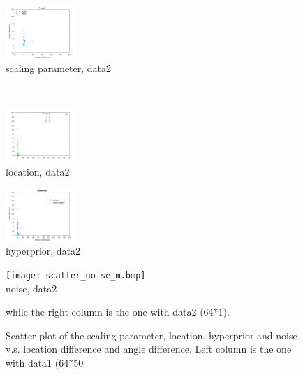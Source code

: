 \documentclass[5p]{elsarticle}
\begin{document}
\begin{frontmatter}
\begin{figure}[h!]
\begin{footnotesize}
\begin{center}
\begin{minipage}{3cm}
\begin{center}
\end{center}\end{minipage}
\begin{minipage}{3cm} \begin{center}
\includegraphics[height=2.0cm]{scatter_theta0_m.png} \\ scaling parameter, data2 
\end{center}\end{minipage}\
\begin{minipage}{3cm} \begin{center}
\includegraphics[height=2.0cm]{scatter_loc_m.png}\\location, data2  
\end{center}\end{minipage}
\begin{minipage}{3cm} \begin{center}
\includegraphics[height=2.0cm]{scatter_hyperprior_m.png} \\ hyperprior, data2  
\end{center}\end{minipage}
\begin{minipage}{3cm} \begin{center}
\texttt{[image: scatter\_noise\_m.bmp]} \\ noise, data2
\end{center}\end{minipage}
\end{center}
\caption{Scatter plot of the scaling parameter, location. hyperprior and noise v.s. location difference and angle difference. Left column is the one with data1 (64*50} while the right column is 
the one with data2 (64*1).
\label{fig_11}
\end{footnotesize}
\end{figure}


\end{frontmatter}
\end{document}
